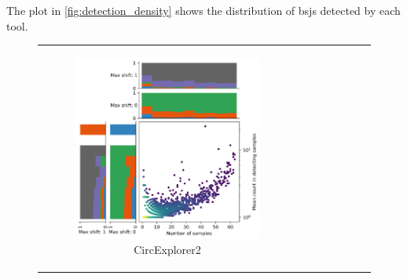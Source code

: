 The plot in \cref{fig:detection_density} shows the distribution of \gls{bsj}s
detected by each tool.

\begin{figure}[ht]
    \begin{tabular}{cc}
        \begin{subfigure}{.4\textwidth}
            \centering

            \includegraphics[width=\linewidth]{chapters/4_results_and_discussion/figures/detection/density/circexplorer2.png}
            \caption{CircExplorer2}

            \label{fig:detection_density_circexplorer2} \end{subfigure} &
        \begin{subfigure}{.4\textwidth} \centering


\end{subfigure}
\end{tabular}
\end{figure}
